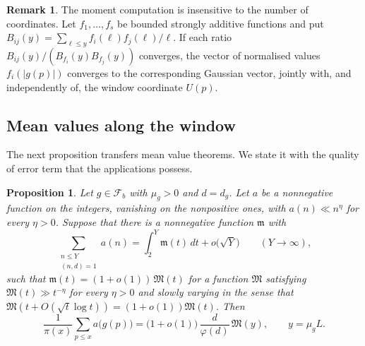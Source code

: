 \documentclass[11pt,reqno]{amsart}
\theoremstyle{plain}
\newtheorem{proposition}[theorem]{Proposition}
\theoremstyle{definition}
\newtheorem{remark}[theorem]{Remark}
\begin{document}
\begin{remark}\label{rem:multiek}
The moment computation is insensitive to the number of coordinates. Let $f_1,\dots,f_s$ be bounded strongly additive functions and put $B_{ij}(y)=\sum_{\ell\le y}f_i(\ell)f_j(\ell)/\ell$. If each ratio $B_{ij}(y)/(B_{f_i}(y)B_{f_j}(y))$ converges, the vector of normalised values $f_i(|g(p)|)$ converges to the corresponding Gaussian vector, jointly with, and independently of, the window coordinate $U(p)$.
\end{remark}

\subsection{Mean values along the window}
The next proposition transfers mean value theorems. We state it with the quality of error term that the applications possess.

\begin{proposition}\label{prop:transfer}
Let $g\in\mathcal F_b$ with $\mu_g>0$ and $d=d_g$. Let $a$ be a nonnegative function on the integers, vanishing on the nonpositive ones, with $a(n)\ll n^{\eta}$ for every $\eta>0$. Suppose that there is a nonnegative function $\mathfrak m$ with
\begin{equation}\label{eq:meanvalue}
\sum_{\substack{n\le Y\\ (n,d)=1}}a(n)=\int_{2}^{Y}\mathfrak m(t)\,dt+o\big(\sqrt Y\big)
\qquad(Y\to\infty),
\end{equation}
such that $\mathfrak m(t)=(1+o(1))\,\mathfrak M(t)$ for a function $\mathfrak M$ satisfying $\mathfrak M(t)\gg t^{-\eta}$ for every $\eta>0$ and slowly varying in the sense that $\mathfrak M(t+O(\sqrt t\log t))=(1+o(1))\mathfrak M(t)$. Then
\[
\frac1{\pi(x)}\sum_{p\le x}a\big(g(p)\big)=\big(1+o(1)\big)\,\frac d{\varphi(d)}\,\mathfrak M(y),
\qquad y=\mu_gL .
\]
\end{proposition}
\end{document}
